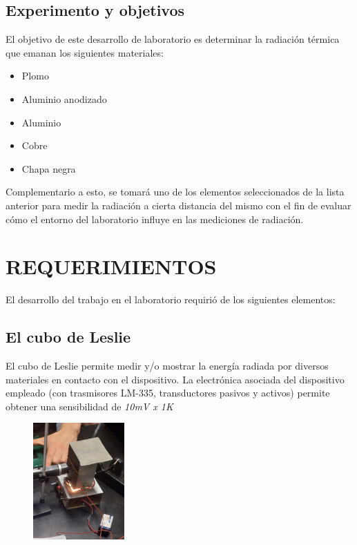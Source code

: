 \documentclass[a4paper]{article}
\begin{document}
        \subsection{Experimento y objetivos}
            \indent El objetivo de este desarrollo de laboratorio es determinar la radiación térmica que emanan los siguientes materiales: \\
            \vspace{-5mm}            
            \begin{itemize}
                \setlength{\itemsep}{0pt}
                \item Plomo 
                \item Aluminio anodizado
                \item Aluminio
                \item Cobre 
                \item Chapa negra
            \end{itemize}
        
            \indent Complementario a esto, se tomará uno de los elementos seleccionados de la lista anterior para medir la radiación a cierta distancia del mismo con el fin de evaluar cómo el entorno del laboratorio influye en las mediciones de radiación. \\


     \section{REQUERIMIENTOS}
        El desarrollo del trabajo en el laboratorio requirió de los siguientes elementos:
        \subsection{El cubo de Leslie}
            \indent El cubo de Leslie permite medir y/o mostrar la energía radiada por diversos materiales en contacto con el dispositivo. 
            \newpage
            \noindent
            \indent La electrónica asociada del dispositivo empleado (con trasmisores LM-335, transductores pasivos y activos) permite obtener una sensibilidad de \textit{10mV x 1\textdegree K} \\

			\begin{figure}[h!]
				\centering
				\includegraphics[width =3.5cm]{./leslie.jpeg}
			\end{figure}
\end{document}
